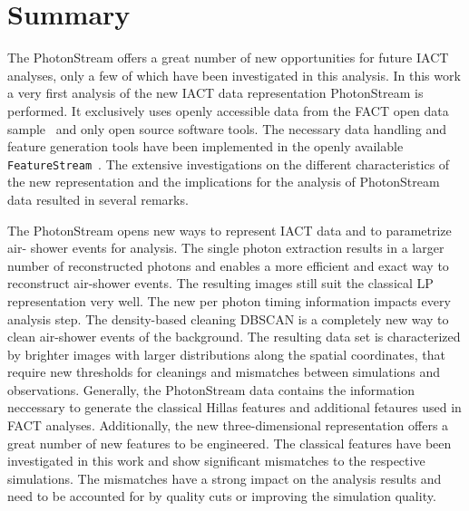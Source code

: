 \chapter{Summary}\label{ch:summary}
%
The PhotonStream offers a great number of new opportunities for future IACT
analyses, only a few of which have been investigated in this analysis.
In this work a very first analysis of the new IACT data representation
PhotonStream is performed. It exclusively uses openly accessible data from the
FACT open data sample~\cite{fact-data} and only open source software tools. The
necessary data handling and feature generation tools have been implemented in
the openly available \texttt{FeatureStream}~\cite{FeatureStream}. The extensive
investigations on the different characteristics of the new representation and
the implications for the analysis of PhotonStream data resulted in several
remarks.

The PhotonStream opens new ways to represent IACT data and to parametrize air-
shower events for analysis. The single photon extraction results in a larger
number of reconstructed photons and enables a more efficient and exact way to
reconstruct air-shower events. The resulting images still suit the classical LP
representation very well. The new per photon timing information impacts every
analysis step. The density-based cleaning DBSCAN is a completely new way to
clean air-shower events of the background. The resulting data set is
characterized by brighter images with larger distributions along the spatial
coordinates, that require new thresholds for cleanings and mismatches between
simulations and observations. Generally, the PhotonStream data contains the
information neccessary to generate the classical Hillas features and additional
fetaures used in FACT analyses. Additionally, the new three-dimensional
representation offers a great number of new features to be engineered. The
classical features have been investigated in this work and show significant
mismatches to the respective simulations. The mismatches have a strong impact
on the analysis results and need to be accounted for by quality cuts or
improving the simulation quality.

